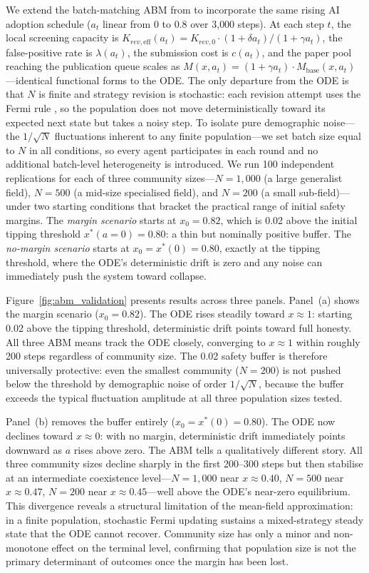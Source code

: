 \documentclass{article}
\begin{document}
We extend the batch-matching ABM from \citet{Bonabeau2002} to incorporate the same rising AI adoption schedule ($a_t$ linear from 0 to 0.8 over 3{,}000 steps).
At each step $t$, the local screening capacity is $K_{rev,\text{eff}}(a_t) = K_{rev,0}\cdot(1+\delta a_t)/(1+\gamma a_t)$, the false-positive rate is $\lambda(a_t)$, the submission cost is $c(a_t)$, and the paper pool reaching the publication queue scales as $M(x,a_t)=(1+\gamma a_t)\cdot M_{\text{base}}(x,a_t)$---identical functional forms to the ODE\@.
The only departure from the ODE is that $N$ is finite and strategy revision is stochastic: each revision attempt uses the Fermi rule \citep{Szabo1998}, so the population does not move deterministically toward its expected next state but takes a noisy step.
To isolate pure demographic noise---the $1/\!\sqrt{N}$ fluctuations inherent to any finite population---we set batch size equal to $N$ in all conditions, so every agent participates in each round and no additional batch-level heterogeneity is introduced.
We run 100 independent replications for each of three community sizes---$N = 1{,}000$ (a large generalist field), $N = 500$ (a mid-size specialised field), and $N = 200$ (a small sub-field)---under two starting conditions that bracket the practical range of initial safety margins.
The \emph{margin scenario} starts at $x_0 = 0.82$, which is 0.02 above the initial tipping threshold $x^*(a=0) = 0.80$: a thin but nominally positive buffer.
The \emph{no-margin scenario} starts at $x_0 = x^*(0) = 0.80$, exactly at the tipping threshold, where the ODE's deterministic drift is zero and any noise can immediately push the system toward collapse.

Figure~\ref{fig:abm_validation} presents results across three panels.
Panel~(a) shows the margin scenario ($x_0 = 0.82$).
The ODE rises steadily toward $x \approx 1$: starting 0.02 above the tipping threshold, deterministic drift points toward full honesty.
All three ABM means track the ODE closely, converging to $x \approx 1$ within roughly 200 steps regardless of community size.
The 0.02 safety buffer is therefore universally protective: even the smallest community ($N = 200$) is not pushed below the threshold by demographic noise of order $1/\!\sqrt{N}$, because the buffer exceeds the typical fluctuation amplitude at all three population sizes tested.

Panel~(b) removes the buffer entirely ($x_0 = x^*(0) = 0.80$).
The ODE now declines toward $x \approx 0$: with no margin, deterministic drift immediately points downward as $a$ rises above zero.
The ABM tells a qualitatively different story.
All three community sizes decline sharply in the first 200--300 steps but then stabilise at an intermediate coexistence level---$N = 1{,}000$ near $x \approx 0.40$, $N = 500$ near $x \approx 0.47$, $N = 200$ near $x \approx 0.45$---well above the ODE's near-zero equilibrium.
This divergence reveals a structural limitation of the mean-field approximation: in a finite population, stochastic Fermi updating sustains a mixed-strategy steady state that the ODE cannot recover.
Community size has only a minor and non-monotone effect on the terminal level, confirming that population size is not the primary determinant of outcomes once the margin has been lost.
\end{document}
